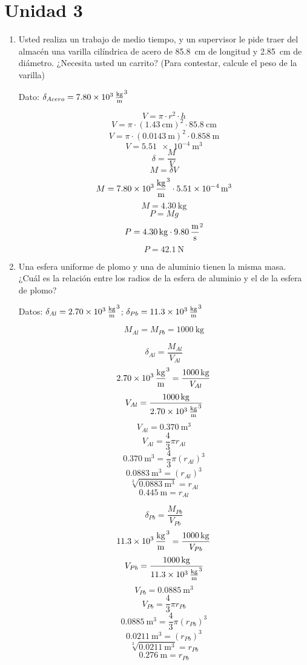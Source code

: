 \documentclass[Física - Práctica.root.tex]{subfiles}
\begin{document}
\section{Unidad 3}

\begin{enumerate}
  \item Usted realiza un trabajo de medio tiempo, y un supervisor le pide traer del almacén una varilla cilíndrica de acero de \SI{85,8}{\cm} de longitud y \SI{2,85}{\cm} de diámetro. ¿Necesita usted un carrito? (Para contestar, calcule el peso de la varilla)

        Dato: $\delta_{Acero}= \SI{7,80e3}{\kilogram\over\meter\cubed}$

        \[V=\pi\cdot r^2\cdot h\]
        \[V=\pi\cdot(\SI{1,43}{\cm})^2\cdot\SI{85,8}{\cm}\]
        \[V=\pi\cdot(\SI{0,0143}{\meter})^2\cdot\SI{0,858}{\meter}\]
        \[V=\SI{5,51e-4}{\meter\cubed}\]
        \[\delta=\frac{M}{V}\]
        \[M=\delta V\]
        \[M=\SI{7,80e3}{\kilogram\over\meter\cubed}\cdot\SI{5,51e-4}{\meter\cubed}\]
        \[M=\SI{4,30}{\kilogram}\]
        \[P=Mg\]
        \[P=\SI{4,30}{\kilogram}\cdot\SI{9,80}{\meter\over\second\squared}\]
        \[P=\boxed{\SI{42,1}{\newton}}\]

  \item Una esfera uniforme de plomo y una de aluminio tienen la misma masa. ¿Cuál es la relación entre los radios de la esfera de aluminio y el de la esfera de plomo?

        Datos: $\delta_{Al}=\SI{2,70e3}{\kilogram\over\meter\cubed}$; $\delta_{Pb}=\SI{11,3e3}{\kilogram\over\meter\cubed}$

        \[M_{Al}=M_{Pb}=\SI{1000}{\kilogram}\]

        \begin{multicols}{2}
          \[\delta_{Al}=\frac{M_{Al}}{V_{Al}}\]
          \[\SI{2,70e3}{\kilogram\over\meter\cubed}=\frac{\SI{1000}{\kilogram}}{V_{Al}}\]
          \[V_{Al}=\frac{\SI{1000}{\kilogram}}{\SI{2,70e3}{\kilogram\over\meter\cubed}}\]
          \[V_{Al}=\SI{0,370}{\meter\cubed}\]
          \[V_{Al}=\frac{4}{3}\pi r_{Al}\]
          \[\SI{0,370}{\meter\cubed}=\frac{4}{3}\pi (r_{Al})^3\]
          \[\SI{0,0883}{\meter\cubed}=(r_{Al})^3\]
          \[\sqrt[3]{\SI{0,0883}{\meter\cubed}}=r_{Al}\]
          \[\SI{0,445}{\meter}=r_{Al}\]

          \[\delta_{Pb}=\frac{M_{Pb}}{V_{Pb}}\]
          \[\SI{11,3e3}{\kilogram\over\meter\cubed}=\frac{\SI{1000}{\kilogram}}{V_{Pb}}\]
          \[V_{Pb}=\frac{\SI{1000}{\kilogram}}{\SI{11,3e3}{\kilogram\over\meter\cubed}}\]
          \[V_{Pb}=\SI{0,0885}{\meter\cubed}\]
          \[V_{Pb}=\frac{4}{3}\pi r_{Pb}\]
          \[\SI{0,0885}{\meter\cubed}=\frac{4}{3}\pi (r_{Pb})^3\]
          \[\SI{0,0211}{\meter\cubed}=(r_{Pb})^3\]
          \[\sqrt[3]{\SI{0,0211}{\meter\cubed}}=r_{Pb}\]
          \[\SI{0,276}{\meter}=r_{Pb}\]
        \end{multicols}


\end{enumerate}
\end{document}
